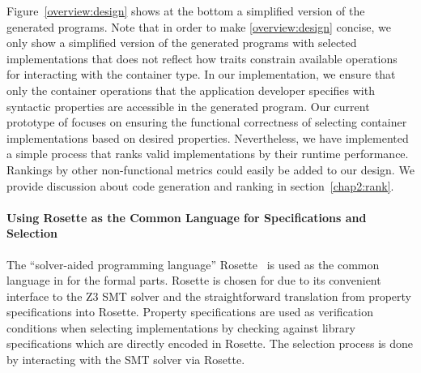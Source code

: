 Figure~\ref{overview:design} shows at the bottom a simplified version of the generated programs.
Note that in order to make \ref{overview:design} concise, we only show a simplified version of the generated programs with selected implementations that does not reflect how traits constrain available operations for interacting with the container type.
In our implementation, we ensure that only the container operations that the application developer specifies with syntactic properties are accessible in the generated program.
%
%
Our current prototype of \Primrose{} focuses on ensuring the functional correctness of selecting container implementations based on desired properties.
Nevertheless, we have implemented a simple process that ranks valid implementations by their runtime performance.
Rankings by other non-functional metrics could easily be added to our design.
We provide discussion about code generation and ranking in section~\ref{chap2:rank}.

\paragraph*{Using Rosette as the Common Language for Specifications and Selection}
\label{common-language}
The ``solver-aided programming language'' Rosette~\citep{rosette-lang, rosette-paper} is used as the common language in \Primrose{} for the formal parts.
Rosette is chosen for \Primrose{} due to its convenient interface to the Z3 SMT solver and the straightforward translation from \Primrose{} property specifications into Rosette.
Property specifications are used as verification conditions when selecting implementations by checking against library specifications which are directly encoded in Rosette. The selection process is done by interacting with the SMT solver via Rosette.


